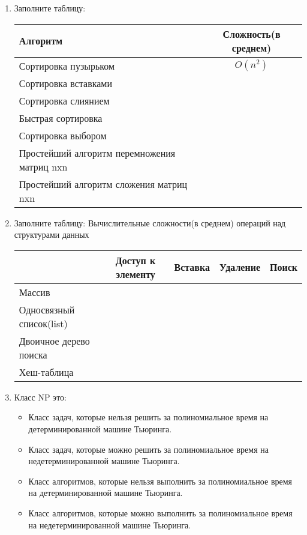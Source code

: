 \documentclass[12pt]{article}
\begin{document}
\begin{enumerate}
\item Заполните таблицу:
\begin{center}
  \begin{tabular}{ l || c }
    \hline
    Алгоритм & Сложность(в среднем) \\ \hline \hline
    Сортировка пузырьком & $O(n^2)$  \\ \hline
    Сортировка вставками &   \\ \hline
    Сортировка слиянием &   \\ \hline
    Быстрая сортировка &   \\ \hline
    Сортировка выбором & \\ \hline
    Простейший алгоритм перемножения матриц nxn & \\ \hline
    Простейший алгоритм сложения матриц nxn & \\ \hline
  \end{tabular}
\end{center}

\item Заполните таблицу: Вычислительные сложности(в среднем) операций над структурами данных
\begin{center}
  \begin{tabular}{ l || c | c | c | c }
    \hline
     & Доступ к элементу & Вставка & Удаление & Поиск \\ \hline \hline
    Массив &  &  &  &  \\ \hline
    Односвязный список(list) &  &  &  & \\ \hline
    Двоичное дерево поиска &  &  &  & \\ \hline
    Хеш-таблица &  &  &  & \\ \hline
  \end{tabular}
\end{center}

\newpage

\item Класс NP это:
\begin{itemize}
\item Класс задач, которые нельзя решить за полиномиальное время на детерминированной машине Тьюринга.
\item Класс задач, которые можно решить за полиномиальное время  на недетерминированной машине Тьюринга.
\item Класс алгоритмов, которые нельзя выполнить за полиномиальное время на детерминированной машине Тьюринга.
\item Класс алгоритмов, которые можно выполнить за полиномиальное время на недетерминированной машине Тьюринга.
\end{itemize}

\end{enumerate}
\end{document}
